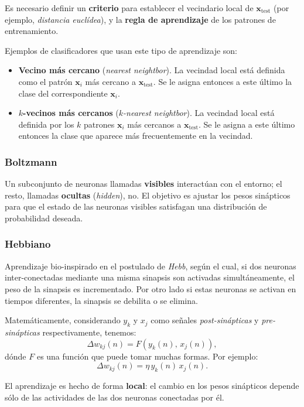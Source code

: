\documentclass[10pt,a4paper]{article}
\begin{document}
\begin{multicols}{2}
Es necesario definir un \textbf{criterio} para establecer el vecindario local de $\mathbf{x}_\text{test}$ (por ejemplo, \textit{distancia euclídea}), y la \textbf{regla de aprendizaje} de los patrones de entrenamiento. 

Ejemplos de clasificadores que usan este tipo de aprendizaje son:
\begin{itemize}
\item \textbf{Vecino más cercano} (\textit{nearest neightbor}). La vecindad local está definida como el patrón $\mathbf{x}_i$ más cercano a $\mathbf{x}_\text{test}$. Se le asigna entonces a este último la clase del correspondiente $\mathbf{x}_i$.
\item \textbf{$k$-vecinos más cercanos} (\textit{$k$-nearest neightbor}). La vecindad local está definida por los $k$ patrones $\mathbf{x}_i$ más cercanos a $\mathbf{x}_\text{test}$. Se le asigna a este último entonces la clase que aparece más frecuentemente en la vecindad.
\end{itemize} 

\subsubsection{Boltzmann}

Un subconjunto de neuronas llamadas \textbf{visibles} interactúan con el entorno; el resto, llamadas \textbf{ocultas} (\textit{hidden}), no. El objetivo es ajustar los pesos sinápticos para que el estado de las neuronas visibles satisfagan una distribución de probabilidad deseada.

\subsubsection{Hebbiano}

Aprendizaje bio-inspirado en el postulado de \textit{Hebb}, según el cual, si dos neuronas inter-conectadas mediante una misma sinapsis son activadas simultáneamente, el peso de la sinapsis es incrementado. Por otro lado si estas neuronas se activan en tiempos diferentes, la sinapsis se debilita o se elimina.

Matemáticamente, considerando $y_k$ y $x_j$ como señales \textit{post-sinápticas} y \textit{pre-sinápticas} respectivamente, tenemos:
\[\Delta w_{kj}(n) = F(y_k(n),\,x_j(n)),\]
dónde $F$ es una función que puede tomar muchas formas. Por ejemplo: 
\[\Delta w_{kj}(n) = \eta\,y_k(n)\,x_j(n).\]

El aprendizaje es hecho de forma \textbf{local}: el cambio en los pesos sinápticos depende sólo de las actividades de las dos neuronas conectadas por él.


\end{multicols}
\end{document}
